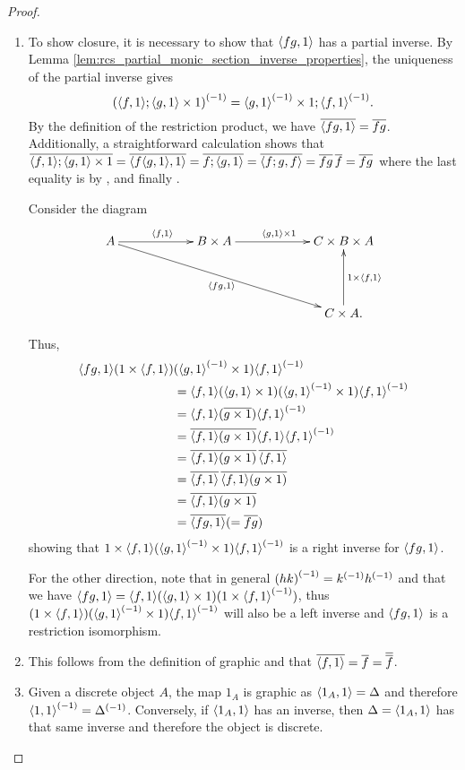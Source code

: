 \begin{proof}
  \prepprooflist
  \begin{enumerate}[{(}i{)}]
    \item To show closure, it is necessary to show that $\langle f g,1\rangle$ has a partial inverse.
      By Lemma \ref{lem:rcs_partial_monic_section_inverse_properties}, the uniqueness of the
      partial inverse gives
      \[
        {(\langle f,1\rangle ; \langle g,1\rangle\times 1)}^{(-1)} = {\langle g,1\rangle}^{(-1)} \times 1 ; {\langle f,1\rangle}^{(-1)} .
      \]
      By the definition of the restriction product, we have $\overline{\langle f g,1\rangle} = \overline{f g}$. Additionally,
      a straightforward calculation shows that
        $\overline{\langle f,1\rangle;\langle g,1\rangle \times 1} =
          \overline{\langle f\langle g,1\rangle, 1\rangle} = \overline{f ;\langle g,1\rangle}
          = \overline{\langle f;g, f\rangle} = \overline{f g}\,\overline{f} = \overline{f g}
        $
      where the last equality is by \rtwo, \rthree and finally \rone.

    Consider the diagram
    \[
      \xymatrix @C+35pt @R+20pt{
        A \ar[r]^{\<f,1\>} \ar[drr]_{\<f g,1\>} &
           B \times A  \ar[r]^{\<g,1\> \times 1}
           &  C \times B \times A \\
        &&C \times A. \ar[u]_{1 \times \<f,1\>}
      }
    \]

    Thus,
    \begin{align*}
      \langle f g,1\rangle  (1\times \langle f,1\rangle) &( {\langle g,1\rangle}^{(-1)}\times 1) {\langle f,1\rangle}^{(-1)}\\
      &=\langle f,1\rangle(\langle g,1\rangle\times 1 ) ({\langle g,1\rangle}^{(-1)}\times 1) {\langle f,1\rangle}^{(-1)}\\
      &=\langle f,1\rangle (\overline{g\times 1}) {\langle f,1\rangle}^{(-1)}\\
      &=\overline{\langle f,1\rangle (g\times 1)}  \langle f,1\rangle {\langle f,1\rangle}^{(-1)}\\
      &=\overline{\langle f,1\rangle (g\times 1)}\,  \overline{\langle f,1\rangle}\\
      &= \overline{\langle f,1\rangle}\, \overline{\langle f,1\rangle(g\times 1)}\\
      &= \overline{\langle f,1\rangle (g\times 1)}\\
      &= \overline{\langle f g,1\rangle}(=\overline{f g})\\
    \end{align*}
    showing that $1\times \langle f,1\rangle  ({\langle g,1\rangle}^{(-1)}\times 1 ) {\langle f,1\rangle}^{(-1)}$ is
    a right inverse for $\langle f g,1\rangle$.

    For the other direction, note that in general ${(h k)}^{(-1)} = {k}^{(-1)}{h}^{(-1)}$ and that
    we have $\langle f g,1\rangle = \langle f,1\rangle (\langle g,1\rangle\times 1)  (1 \times {\langle f,1\rangle}^{(-1)})$, thus
    $(1\times \langle f,1\rangle)  ({\langle g,1\rangle}^{(-1)}\times 1) {\langle f,1\rangle}^{(-1)}$ will also be a left inverse and
    $\langle f g,1\rangle$ is a restriction isomorphism.

    \item This follows from the definition of graphic and that
       $\overline{\langle f,1\rangle} = \overline{f} = \overline{\overline{f}}$.

    \item Given a discrete object $A$, the map $1_A$ is graphic as $\langle1_A,1\rangle = \Delta$
      and therefore ${\langle1,1\rangle}^{(-1)} = {\Delta}^{(-1)}$. Conversely, if $\langle1_A,1\rangle$ has an inverse,
      then $\Delta = \langle1_A,1\rangle$ has that same inverse and therefore the object is discrete.
  \end{enumerate}
\end{proof}

